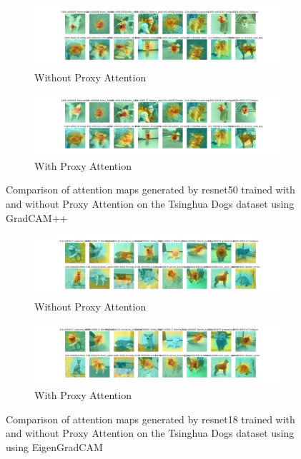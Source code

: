 \documentclass[a4paper,11pt,openright]{book}
\begin{document}
\begin{figure}[!htb]
    \centering
    \begin{subfigure}[b]{1\textwidth}
        \includegraphics[width=\textwidth]{images/gpp_tsing_resnet50_noproxy_3.pdf}
        \caption{Without Proxy Attention}
    \end{subfigure}
    \hfill
    \begin{subfigure}[b]{1\textwidth}
        \includegraphics[width=\textwidth]{images/gpp_tsing_resnet50_proxy_3.pdf}
        \caption{With Proxy Attention}
    \end{subfigure}
    \caption{Comparison of attention maps generated by resnet50 trained with and without Proxy Attention on the Tsinghua Dogs dataset using GradCAM++}
\end{figure}


\begin{figure}[!htb]
    \centering
    \begin{subfigure}[b]{1\textwidth}
        \includegraphics[width=\textwidth]{images/tsing_resnet18_noproxy_1.pdf}
        \caption{Without Proxy Attention}
    \end{subfigure}
    \hfill
    \begin{subfigure}[b]{1\textwidth}
        \includegraphics[width=\textwidth]{images/tsing_resnet18_proxy_1.pdf}
        \caption{With Proxy Attention}
    \end{subfigure}
    \caption{Comparison of attention maps generated by resnet18 trained with and without Proxy Attention on the Tsinghua Dogs dataset using using EigenGradCAM}
\end{figure}
\end{document}
